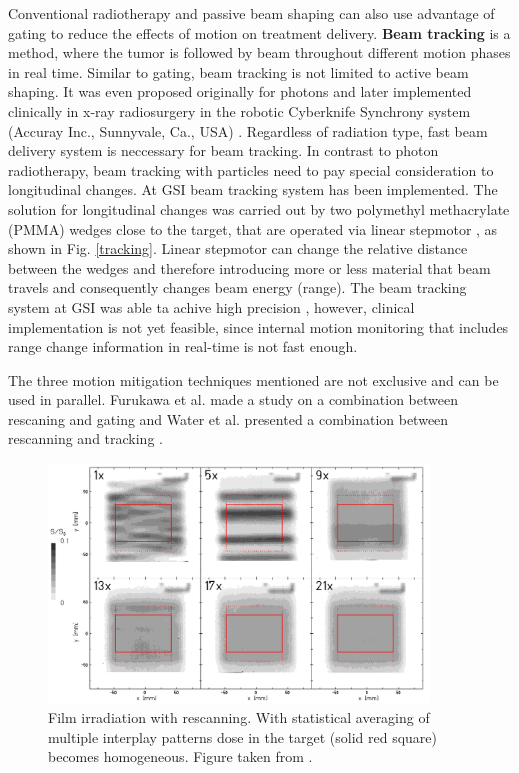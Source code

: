 \documentclass[type=dr, dr=rernat, accentcolor=tud7b,colorbacktitle, bigchapter, openright, twoside, 12pt ]{tudthesis}
\begin{document}
Conventional radiotherapy and passive beam shaping can also use advantage of gating to reduce the effects of motion on treatment delivery.
\newline
\textbf{Beam tracking} is a method, where the tumor is followed by beam throughout different motion phases in real time. Similar to gating, beam tracking is not limited to active beam shaping. It was even proposed originally 
for photons \cite{Keall2001} and later implemented clinically in x-ray radiosurgery in the robotic Cyberknife Synchrony system (Accuray Inc., Sunnyvale, Ca., USA) \cite{Brown2007a,Kilby2010}. Regardless of radiation type, 
fast beam delivery system is neccessary for beam tracking. In contrast to photon radiotherapy, beam tracking with particles need to pay special consideration to longitudinal changes. At GSI beam tracking system has been implemented.
The solution for longitudinal changes was carried out by two polymethyl methacrylate (PMMA) wedges close to the target, that are operated via linear stepmotor \cite{Saito2009}, as shown in Fig. \ref{tracking}. Linear stepmotor can
change the relative distance between the wedges and therefore introducing more or less material that beam travels and consequently changes beam energy (range). The beam tracking system at GSI was able ta achive high precision \cite{Bert2007, Bert2009, Saito2009},
however, clinical implementation is not yet feasible, since internal motion monitoring that includes range change information in real-time is not fast enough.


The three motion mitigation techniques mentioned are not exclusive and can be used in parallel. Furukawa et al. made a study on a combination between rescaning and gating \cite{Furukawa2007} and Water et al. presented a combination
between rescanning and tracking \cite{Water2009}.
\begin{figure}[H]
\begin{center}
\includegraphics[width=0.9\textwidth]{./Images/rescanning.png}
\caption{Film irradiation with rescanning. With statistical averaging of multiple interplay patterns dose in the target (solid red square) becomes homogeneous. Figure taken from \cite{Bert09}.}
\label{rescanning}
\end{center}
\end{figure}
\end{document}
